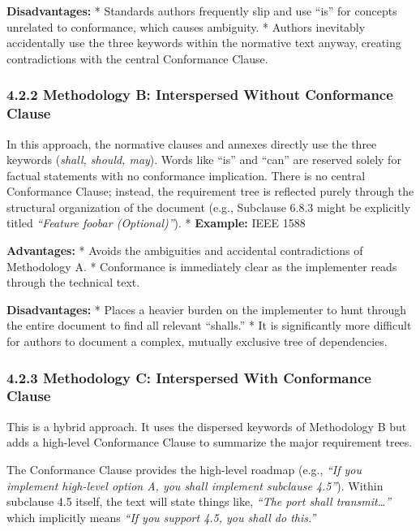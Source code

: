 \textbf{Disadvantages:} * Standards authors frequently slip and use
``is'' for concepts unrelated to conformance, which causes ambiguity. *
Authors inevitably accidentally use the three keywords within the
normative text anyway, creating contradictions with the central
Conformance Clause.

\subsubsection{4.2.2 Methodology B: Interspersed Without Conformance
Clause}\label{methodology-b-interspersed-without-conformance-clause}

In this approach, the normative clauses and annexes directly use the
three keywords (\emph{shall, should, may}). Words like ``is'' and
``can'' are reserved solely for factual statements with no conformance
implication. There is no central Conformance Clause; instead, the
requirement tree is reflected purely through the structural organization
of the document (e.g., Subclause 6.8.3 might be explicitly titled
\emph{``Feature foobar (Optional)''}). * \textbf{Example:} IEEE 1588

\textbf{Advantages:} * Avoids the ambiguities and accidental
contradictions of Methodology A. * Conformance is immediately clear as
the implementer reads through the technical text.

\textbf{Disadvantages:} * Places a heavier burden on the implementer to
hunt through the entire document to find all relevant ``shalls.'' * It
is significantly more difficult for authors to document a complex,
mutually exclusive tree of dependencies.

\subsubsection{4.2.3 Methodology C: Interspersed With Conformance
Clause}\label{methodology-c-interspersed-with-conformance-clause}

This is a hybrid approach. It uses the dispersed keywords of Methodology
B but adds a high-level Conformance Clause to summarize the major
requirement trees.

The Conformance Clause provides the high-level roadmap (e.g., \emph{``If
you implement high-level option A, you shall implement subclause
4.5''}). Within subclause 4.5 itself, the text will state things like,
\emph{``The port shall transmit\ldots{}''} which implicitly means
\emph{``If you support 4.5, you shall do this.''}


